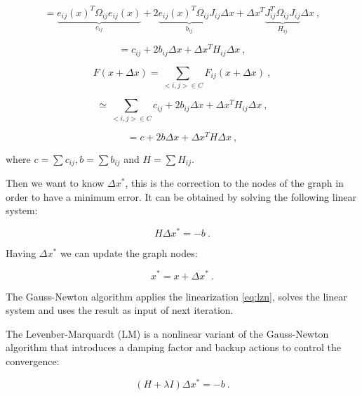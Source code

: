 \begin{equation}
\label{eq:globalFuncAprox2}
 =  \underbrace{e_{ij}(x)^T \Omega_{ij} e_{ij}(x)}_{c_{ij}} + 2  \underbrace{e_{ij}(x)^T \Omega_{ij} J_{ij}}_{b_{ij}} \Delta x + \Delta x^T \underbrace{ J_{ij}^T  \Omega_{ij} J_{ij}}_{H_{ij}} \Delta x \ ,
\end{equation}

\begin{equation}
\label{eq:globalFuncAprox2}
 = c_{ij} + 2 b_{ij} \Delta x + \Delta x^T H_{ij} \Delta x \ ,
\end{equation}


\begin{equation}
F(x + \Delta x) =  \sum\limits_{<i,j> \in C } F_{ij}(x + \Delta x) \ ,
\end{equation}



\begin{equation}
\simeq  \sum\limits_{<i,j> \in C } c_{ij} + 2 b_{ij} \Delta x + \Delta x^T H_{ij} \Delta x \ ,
\end{equation}

\begin{equation}
\label{eq:lzn}
=   c + 2 b \Delta x + \Delta x^T H \Delta x \ ,
\end{equation}

\noindent where $c=\sum{c_{ij}}, b=\sum{b_{ij}}$ and $H=\sum{H_{ij}}$.

\noindent Then we want to know $\Delta x^*$, this is the correction to the nodes of the graph in order 
to have a minimum error. It can be obtained by solving the following linear system:

\begin{equation}
H \Delta x^* = -b \ .
\end{equation}

\noindent Having $\Delta x^*$ we can update the graph nodes:

\begin{equation}
x^* = x + \Delta x^* \ .
\end{equation}

The Gauss-Newton algorithm applies the linearization \ref{eq:lzn}, solves the linear system and uses the result as input of next iteration.

The Levenber-Marquardt (LM) is a nonlinear variant of the Gauss-Newton algorithm that introduces a
damping factor and backup actions to control the convergence:

\begin{equation}
(H + \lambda I) \Delta x^* = -b \ .
\end{equation}

